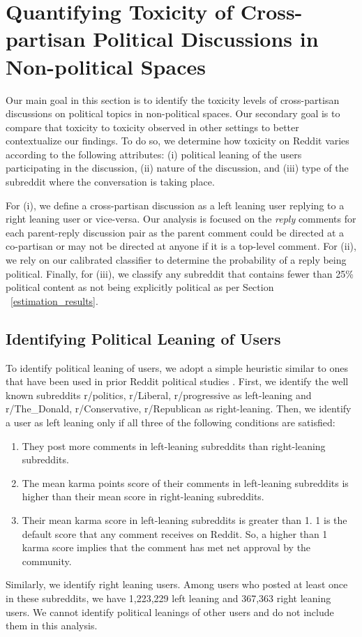 \documentclass[letterpaper]{article} %
\begin{document}
\section{Quantifying Toxicity of Cross-partisan Political Discussions in Non-political Spaces}

Our main goal in this section is to identify the toxicity levels of cross-partisan discussions on political topics in non-political spaces.
Our secondary goal is to compare that toxicity to toxicity observed in other settings to better contextualize our findings. To do so, we determine how toxicity on Reddit varies according to the following attributes: (i) political leaning of the users participating in the discussion, (ii) nature of the discussion, and (iii) type of the subreddit where the conversation is taking place.

For (i), we define a cross-partisan discussion as a left leaning user replying to a right leaning user or vice-versa.
Our analysis is focused on the \textit{reply} comments for each parent-reply discussion pair as the parent comment could be directed at a co-partisan or may not be directed at anyone if it is a top-level comment.
For (ii), we rely on our calibrated classifier to determine the probability of a reply being political. Finally, for (iii), we classify any subreddit that contains fewer than 25\% political content as not being explicitly political as per Section ~\ref{estimation_results}.

\subsection{Identifying Political Leaning of Users}
To identify political leaning of users, we adopt a simple heuristic similar to ones that have been used in prior Reddit political studies \cite{an2019political,soliman2019characterization}. First, we identify the well known subreddits r/politics, r/Liberal, r/progressive as left-leaning and r/The\_Donald, r/Conservative, r/Republican as right-leaning. Then, we identify a user as left leaning only if all three of the following conditions are satisfied:
\begin{enumerate}
    \item They post more comments in left-leaning subreddits than right-leaning subreddits.
    \item The mean karma points score of their comments in left-leaning subreddits is higher than their mean score in right-leaning subreddits.
    \item Their mean karma score in left-leaning subreddits is greater than 1. 1 is the default score that any comment receives on Reddit. So, a higher than 1 karma score implies that the comment has met net approval by the community.
\end{enumerate}
Similarly, we identify right leaning users. Among users who posted at least once in these subreddits, we have 1,223,229 left leaning and 367,363 right leaning users. We cannot identify  political leanings of other users and do not include them in this analysis.
\end{document}
